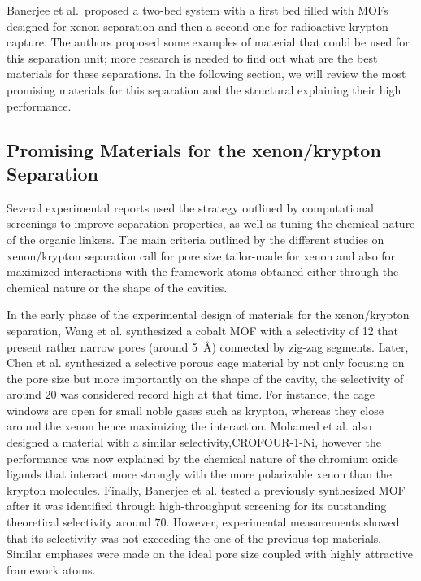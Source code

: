 \documentclass[main.tex]{subfiles}
\begin{document}
Banerjee et al.\ proposed a two-bed system with a first bed filled with MOFs designed for xenon separation and then a second one for radioactive krypton capture.\cite{Banerjee_2014} The authors proposed some examples of material that could be used for this separation unit; more research is needed to find out what are the best materials for these separations. In the following section, we will review the most promising materials for this separation and the structural explaining their high performance. 


\subsection{Promising Materials for the xenon/krypton Separation}

Several experimental reports used the strategy outlined by computational screenings to improve separation properties, as well as tuning the chemical nature of the organic linkers. The main criteria outlined by the different studies on xenon/krypton separation call for pore size tailor-made for xenon and also for maximized interactions with the framework atoms obtained either through the chemical nature or the shape of the cavities. 

In the early phase of the experimental design of materials for the xenon/krypton separation, Wang et al. synthesized a cobalt MOF  with a selectivity of 12 that present rather narrow pores (around \SI{5}{\angstrom}) connected by zig-zag segments.\cite{Wang_2014} Later, Chen et al. synthesized a selective porous cage material by not only focusing on the pore size but more importantly on the shape of the cavity, the selectivity of around $20$ was considered record high at that time. For instance, the cage windows are open for small noble gases such as krypton, whereas they close around the xenon hence maximizing the interaction.\cite{Chen_2014} Mohamed et al. also designed a material with a similar selectivity,CROFOUR-1-Ni, however the performance was now explained by the chemical nature of the chromium oxide ligands that interact more strongly with the more polarizable xenon than the krypton molecules.\cite{Mohamed_2016} Finally, Banerjee et al. tested a previously synthesized\cite{KAXQIL} MOF after it was identified through high-throughput screening\cite{Simon_2015} for its outstanding theoretical selectivity around $70$. However, experimental measurements showed that its selectivity was not exceeding the one of the previous top materials. Similar emphases were made on the ideal pore size coupled with highly attractive framework atoms.\cite{Banerjee_2016}
\end{document}
